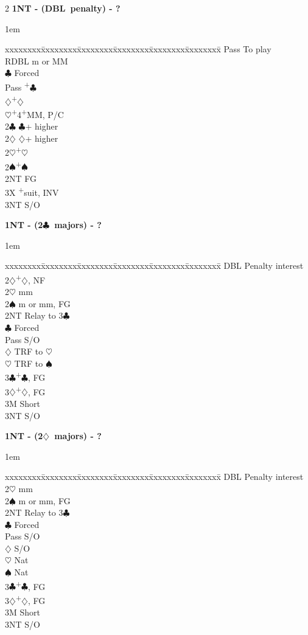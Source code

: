 \documentclass[10pt]{article}
\renewcommand{\c}{$\clubsuit$}
\renewcommand{\d}{$\diamondsuit$}
\newcommand{\h}{$\heartsuit$}
\newcommand{\s}{$\spadesuit$}
\newcommand{\p}{\textsuperscript{+}}
\newcommand{\x}{DBL}
\newcommand{\xx}{RDBL}
\newenvironment{bidtable}[1][]
{\textbf{#1}
  \begin{adjustwidth}{1em}{}
    \addvspace{2pt}
    \begin{tabbing}
      xxxxxxxx\=xxxxxxxx\=xxxxxxxx\=xxxxxxxx\=xxxxxxxx\=xxxxxxxx\=\kill}
{\end{tabbing}\end{adjustwidth}\bigskip}%
\begin{document}
\begin{multicols*}{2}
\begin{bidtable}[1NT - (\x\ penalty) - ?]
Pass \> To play                       \\
\xx  \> m or MM                       \\
     \c \> Forced                 \\
     \>     \> Pass \p\c          \\
     \>     \d  {}\p\d          \\
     \>     \h  {}\p4\p MM, P/C \\
2\c  \> \c + higher                   \\
2\d  \> \d + higher                   \\
2\h  {}\p\h                         \\
2\s  {}\p\s                         \\
2NT  \> FG                            \\
3X   \p suit, INV                 \\
3NT  \> S/O
\end{bidtable}

\begin{bidtable}[1NT - (2\c\ majors) - ?]
\x  \> Penalty interest         \\
2\d {}\p\d, NF                \\
2\h \> mm                       \\
2\s \> m or mm, FG              \\
2NT \> Relay to 3\c             \\
    \c \> Forced            \\
    \>     \> Pass \> S/O       \\
    \>     \d  \> TRF to \h \\
    \>     \h  \> TRF to \s \\
3\c {}\p\c, FG                \\
3\d {}\p\d, FG                \\
3M  \> Short                    \\
3NT \> S/O
\end{bidtable}

\begin{bidtable}[1NT - (2\d\ majors) - ?]
\x  \> Penalty interest   \\
2\h \> mm                 \\
2\s \> m or mm, FG        \\
2NT \> Relay to 3\c       \\
    \c \> Forced      \\
    \>     \> Pass \> S/O \\
    \>     \d  \> S/O \\
    \>     \h  \> Nat \\
    \>     \s  \> Nat \\
3\c {}\p\c, FG          \\
3\d {}\p\d, FG          \\
3M  \> Short              \\
3NT \> S/O
\end{bidtable}


\end{multicols*}
\end{document}

